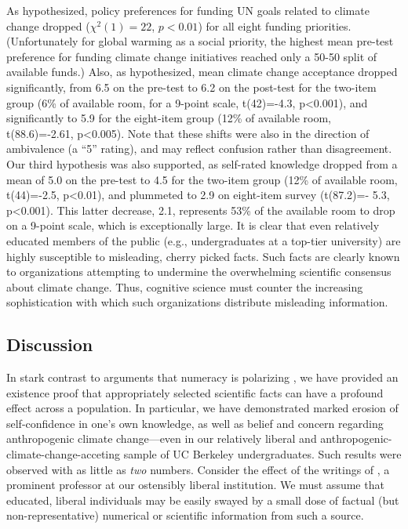 As hypothesized, policy preferences for funding UN goals
related to climate change dropped ($\chi^2(1)=22$, $p<0.01$) for all eight funding
priorities. (Unfortunately for global warming as a social priority, the highest
mean pre-test preference for funding climate change initiatives reached only a
50-50 split of available funds.) Also, as hypothesized, mean climate change
acceptance dropped significantly, from 6.5 on the pre-test to 6.2 on the
post-test for the two-item group (6\% of available room, for a 9-point scale,
t(42)=-4.3, p<0.001), and significantly to 5.9 for the eight-item group (12\% of
available room, t(88.6)=‑2.61, p<0.005). Note that these shifts were also in the
direction of ambivalence (a ``5'' rating), and may reflect confusion rather than
disagreement. Our third hypothesis was also supported, as self-rated knowledge
dropped from a mean of 5.0 on the pre-test to 4.5 for the two-item group (12\% of
available room, t(44)=-2.5, p<0.01), and plummeted to 2.9 on eight-item survey
(t(87.2)=- 5.3, p<0.001). This latter decrease, 2.1, represents 53\% of the
available room to drop on a 9-point scale, which is exceptionally large.  It is
clear that even relatively educated members of the public (e.g., undergraduates
at a top-tier university) are highly susceptible to misleading, cherry picked
facts. Such facts are clearly known to organizations attempting to undermine the
overwhelming scientific consensus about climate change. Thus, cognitive science
must counter the increasing sophistication with which such organizations
distribute misleading information.

\subsection{Discussion}

In stark contrast to arguments that numeracy is polarizing \parencite{kahan}, we
have provided an existence proof that appropriately selected scientific facts
can have a profound effect across a population. In particular, we have
demonstrated marked erosion of self-confidence in one's own knowledge, as well
as belief and concern regarding anthropogenic climate change---even in our
relatively liberal and anthropogenic-climate-change-acceting sample of UC
Berkeley undergraduates.  Such results were observed with as little as
\emph{two} numbers.
Consider the effect of the writings of \textcite{mueller}, a prominent professor
at our ostensibly liberal institution. We must assume that educated, liberal
individuals may be easily swayed by a small dose of factual (but
non-representative) numerical or scientific information from such a source.

